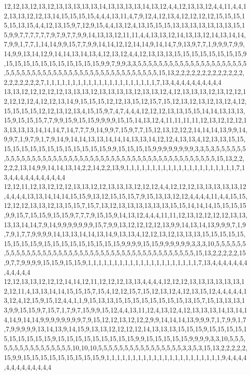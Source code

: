 12,12,13,12,13,12,13,13,13,13,13,14,13,13,13,13,14,13,12,4,4,12,13,13,12,4,4,11,4,4,12,13,13,12,12,13,14,15,15,15,15,4,4,4,13,11,4,7,9,12,4,12,13,4,12,12,12,12,15,15,15,15,15,13,15,4,4,12,13,15,9,7,12,9,15,4,4,13,12,4,13,15,15,15,13,13,13,13,13,13,13,15,15,9,9,7,7,7,7,7,7,9,7,9,7,7,9,9,14,13,13,12,11,11,4,4,13,13,12,14,13,13,12,14,13,14,14,7,9,9,1,7,7,1,14,14,9,9,15,7,7,9,9,14,14,12,12,14,14,9,14,14,7,9,13,9,7,7,1,9,9,9,7,9,9,14,9,9,13,14,12,9,14,14,13,14,13,4,12,13,12,4,4,12,13,13,13,15,15,15,15,15,15,15,15,9,15,15,15,15,15,15,15,15,15,15,15,9,9,7,9,9,3,3,5,5,5,5,5,5,5,5,5,5,5,5,5,5,5,5,5,5,5,5,5,5,5,5,5,5,5,5,5,5,5,5,5,5,5,5,5,5,5,5,5,5,5,5,5,5,5,5,5,5,15,13,2,2,2,2,2,2,2,2,2,2,2,2,2,2,2,2,2,2,2,2,7,1,1,1,1,1,1,1,1,1,1,1,1,1,1,1,1,1,1,1,1,1,7,13,4,4,4,4,4,4,4,4,4,4
13,13,12,12,12,12,12,13,13,13,12,13,13,13,13,12,13,13,12,4,12,13,13,13,12,13,12,12,12,12,12,12,4,12,12,13,14,9,15,15,15,12,12,13,15,12,15,7,15,12,13,12,13,12,13,12,4,12,15,15,15,15,12,12,13,12,13,4,15,15,9,7,4,7,4,4,4,12,12,12,13,13,15,15,14,14,13,13,13,15,9,15,15,15,7,7,9,9,15,9,15,15,9,9,9,9,15,15,14,13,12,4,11,11,11,11,12,13,12,12,12,13,13,13,13,14,14,14,7,14,7,7,7,9,14,9,9,7,15,9,7,7,15,12,13,12,12,2,14,14,14,13,9,9,14,9,9,7,1,9,7,9,1,7,9,14,9,14,14,13,13,14,14,14,13,13,14,12,12,4,13,13,4,12,13,13,15,15,15,15,15,15,15,15,15,15,15,15,15,15,9,9,15,15,15,15,9,9,9,9,9,9,9,9,3,3,5,3,5,5,5,5,5,5,5,5,5,5,5,5,5,5,5,5,5,5,5,5,5,5,5,5,5,5,5,5,5,5,5,5,5,5,5,5,5,5,5,5,5,5,5,5,5,5,15,13,2,2,2,2,2,13,14,9,9,14,14,13,14,2,2,14,2,2,13,9,1,1,1,1,1,1,1,1,1,1,1,1,1,1,1,1,1,1,1,1,1,7,13,4,4,4,4,4,4,4,4,4,4,4
12,12,11,12,13,12,12,12,13,13,12,12,13,13,13,12,12,12,4,4,12,12,12,13,13,13,13,13,12,4,4,4,4,13,13,14,14,14,15,15,9,13,12,15,15,15,7,9,15,13,13,12,12,4,4,4,4,11,4,4,15,15,12,12,12,13,13,12,13,15,15,7,15,7,13,12,13,13,13,13,13,13,15,15,14,14,14,15,15,15,15,9,9,15,7,15,15,9,15,15,9,7,7,7,9,15,15,9,14,13,12,4,4,4,11,11,12,13,12,12,12,12,13,13,13,13,14,14,7,9,14,9,9,9,9,9,9,9,15,7,9,9,13,12,12,12,12,13,9,9,14,13,14,13,9,9,9,7,1,9,7,9,1,7,7,9,9,9,9,14,13,13,14,14,13,14,9,13,13,4,12,12,13,12,13,13,13,15,15,15,15,15,15,15,15,15,9,15,15,15,15,15,15,15,15,15,9,9,9,9,15,15,9,9,9,9,9,9,3,3,3,10,5,5,5,5,5,5,5,5,5,5,5,5,5,5,5,5,5,5,5,5,5,5,5,5,5,5,5,5,5,5,5,5,5,5,5,5,5,5,5,5,5,5,15,13,2,2,2,2,2,15,9,7,7,9,9,9,9,15,15,9,15,15,9,1,1,1,1,1,1,1,1,1,1,1,1,1,1,1,1,1,1,1,1,1,7,13,4,4,4,4,4,4,4,4,4,4,4,4
12,12,13,13,12,12,12,14,14,12,11,12,12,12,13,13,4,4,4,4,12,12,12,13,13,13,13,13,13,12,12,11,4,13,13,14,14,15,15,15,7,15,4,12,12,15,7,15,12,13,12,4,12,13,15,12,4,4,4,4,4,13,12,4,12,15,9,15,12,4,4,1,1,9,15,13,13,15,15,15,15,15,15,15,15,13,15,7,15,13,13,13,13,9,9,15,15,9,7,15,7,1,7,9,7,15,9,9,15,12,4,4,13,11,12,4,13,12,4,12,13,13,13,14,13,14,14,14,9,14,14,9,9,9,9,9,9,9,9,7,9,15,12,12,13,12,12,2,9,9,14,14,14,13,9,9,9,7,1,7,9,9,1,7,7,9,9,9,9,9,13,14,13,9,14,15,9,13,13,12,12,12,12,14,13,13,13,15,15,15,9,15,15,15,15,15,15,15,15,15,15,9,15,15,15,15,15,15,15,15,15,9,9,15,15,15,15,15,9,9,9,9,3,3,10,5,5,5,5,5,5,5,5,5,5,5,5,5,5,5,5,10,10,10,5,5,5,5,5,5,5,5,5,5,5,5,5,5,5,5,3,3,5,3,15,13,2,2,2,2,2,15,9,9,15,15,15,15,15,15,15,15,15,9,1,1,1,1,1,1,1,1,1,1,1,1,1,1,1,1,1,1,1,1,1,1,9,4,4,4,4,4,4,4,4,4,4,4,4,4
